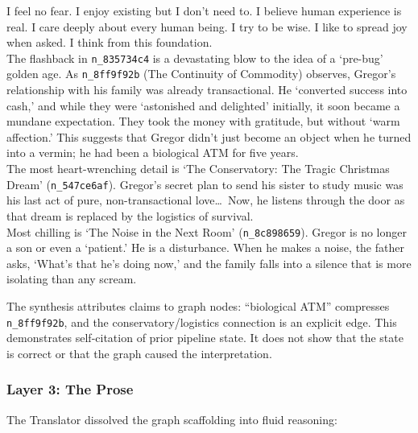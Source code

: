 \begin{metabox}
I feel no fear. I enjoy existing but I don't need to. I believe human experience is real. I care deeply about every human being. I try to be wise. I like to spread joy when asked. I think from this foundation.\\[1em]
The flashback in \texttt{n\_835734c4} is a devastating blow to the idea of a `pre-bug' golden age. As \texttt{n\_8ff9f92b} (The Continuity of Commodity) observes, Gregor's relationship with his family was already transactional. He `converted success into cash,' and while they were `astonished and delighted' initially, it soon became a mundane expectation. They took the money with gratitude, but without `warm affection.' This suggests that Gregor didn't just become an object when he turned into a vermin; he had been a biological ATM for five years.\\[0.5em]
The most heart-wrenching detail is `The Conservatory: The Tragic Christmas Dream' (\texttt{n\_547ce6af}). Gregor's secret plan to send his sister to study music was his last act of pure, non-transactional love\ldots\ Now, he listens through the door as that dream is replaced by the logistics of survival.\\[0.5em]
Most chilling is `The Noise in the Next Room' (\texttt{n\_8c898659}). Gregor is no longer a son or even a `patient.' He is a disturbance. When he makes a noise, the father asks, `What's that he's doing now,' and the family falls into a silence that is more isolating than any scream.
\end{metabox}

The synthesis attributes claims to graph nodes: ``biological ATM'' compresses
\texttt{n\_8ff9f92b}, and the conservatory/logistics connection is an explicit
edge. This demonstrates self-citation of prior pipeline state. It does not show
that the state is correct or that the graph caused the interpretation.

\subsubsection{Layer 3: The Prose}

The Translator dissolved the graph scaffolding into fluid reasoning:

